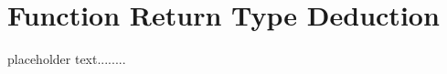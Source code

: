 \newpage
{}
\section[Deduced Return Types\hspace*{1em}(Function Return Type Deduction)]{Function Return Type Deduction}\label{Function-Return-Type-Deduction}




placeholder text........


